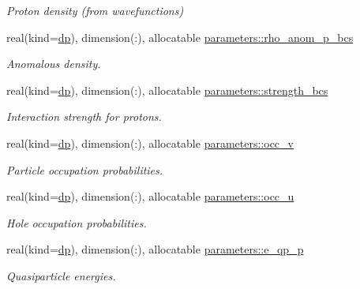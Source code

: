 \begin{DoxyCompactItemize}
\begin{DoxyCompactList}\small\item\em Proton density (from wavefunctions) \end{DoxyCompactList}\item 
real(kind=\mbox{\hyperlink{namespaceparameters_a52f8c6351fd79345d8811e065bcbbb37}{dp}}), dimension(\+:), allocatable \mbox{\hyperlink{group__PAIRING_ga5ad9bf187e94e8effb3d4bbcc2f2495f}{parameters\+::rho\+\_\+anom\+\_\+p\+\_\+bcs}}
\begin{DoxyCompactList}\small\item\em Anomalous density. \end{DoxyCompactList}\item 
real(kind=\mbox{\hyperlink{namespaceparameters_a52f8c6351fd79345d8811e065bcbbb37}{dp}}), dimension(\+:), allocatable \mbox{\hyperlink{group__PAIRING_ga94c22855af03bc8be5e687f4c8a80ee1}{parameters\+::strength\+\_\+bcs}}
\begin{DoxyCompactList}\small\item\em Interaction strength for protons. \end{DoxyCompactList}\item 
real(kind=\mbox{\hyperlink{namespaceparameters_a52f8c6351fd79345d8811e065bcbbb37}{dp}}), dimension(\+:), allocatable \mbox{\hyperlink{group__PAIRING_ga653f936e90e0606e8b49069e9d2c03d4}{parameters\+::occ\+\_\+v}}
\begin{DoxyCompactList}\small\item\em Particle occupation probabilities. \end{DoxyCompactList}\item 
real(kind=\mbox{\hyperlink{namespaceparameters_a52f8c6351fd79345d8811e065bcbbb37}{dp}}), dimension(\+:), allocatable \mbox{\hyperlink{group__PAIRING_ga705a97e5d2ac10a6facfe20757a6bbd4}{parameters\+::occ\+\_\+u}}
\begin{DoxyCompactList}\small\item\em Hole occupation probabilities. \end{DoxyCompactList}\item 
real(kind=\mbox{\hyperlink{namespaceparameters_a52f8c6351fd79345d8811e065bcbbb37}{dp}}), dimension(\+:), allocatable \mbox{\hyperlink{group__PAIRING_ga19d67e5b89ebd51642f7ef33a88d5cb2}{parameters\+::e\+\_\+qp\+\_\+p}}
\begin{DoxyCompactList}\small\item\em Quasiparticle energies. \end{DoxyCompactList}\item 

\end{DoxyCompactItemize}
